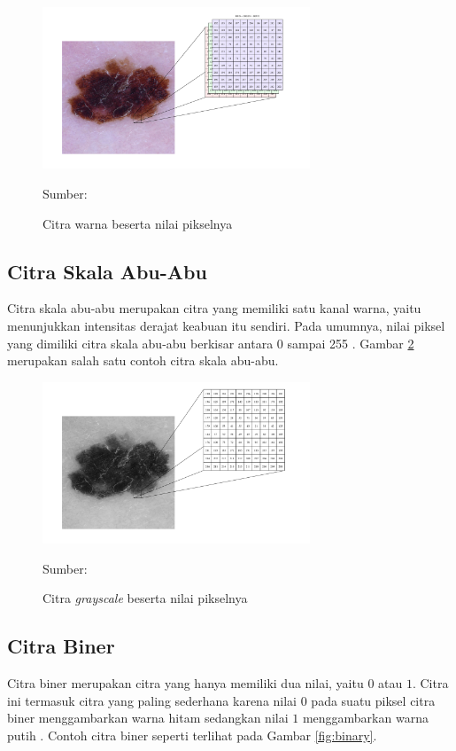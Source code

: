     \begin{figure}[H]
        \begin{center}
            \includegraphics[width=8cm]{../img/Citra Warna - Latex.png}
            \caption{Citra warna beserta nilai pikselnya}
            \label{fig:color}
            Sumber: \citep{Kusumanto2011}
        \end{center}
    \end{figure}

    \subsection{Citra Skala Abu-Abu}
    Citra skala abu-abu merupakan citra yang memiliki satu kanal warna, yaitu menunjukkan intensitas derajat keabuan itu sendiri. Pada umumnya, nilai piksel yang dimiliki citra skala abu-abu berkisar antara 0 sampai 255 \citep{Kusumanto2011}. Gambar \ref{fig:grayscale} merupakan salah satu contoh citra skala abu-abu.

    \begin{figure}[H]
        \begin{center}
            \includegraphics[width=8cm]{../img/Citra Grayscale - Latex.png}
            \caption{Citra \textit{grayscale} beserta nilai pikselnya}
            \label{fig:grayscale}
            Sumber: \citep{Kusumanto2011}
        \end{center}
    \end{figure}

    \subsection{Citra Biner}
    Citra biner merupakan citra yang hanya memiliki dua nilai, yaitu $0$ atau $1$. Citra ini termasuk citra yang paling sederhana karena nilai $0$ pada suatu piksel citra biner menggambarkan warna hitam sedangkan nilai $1$ menggambarkan warna putih \citep{Kusumanto2011}. Contoh citra biner seperti terlihat pada Gambar \ref{fig:binary}.

